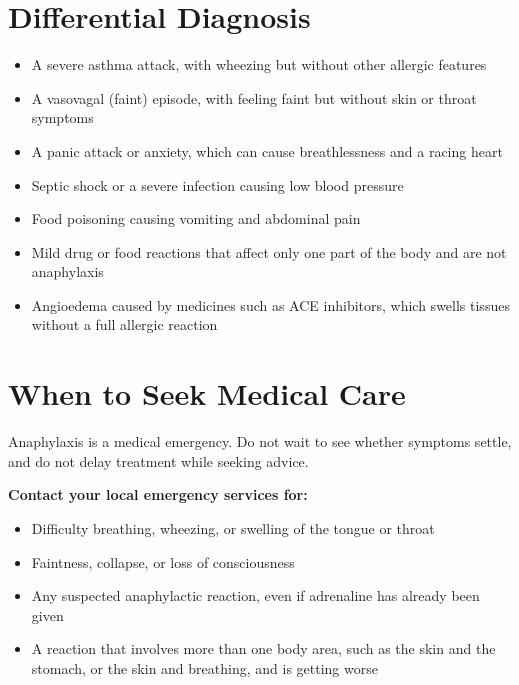 \section*{Differential Diagnosis}
\begin{itemize}
    \item A severe asthma attack, with wheezing but without other allergic features
    \item A vasovagal (faint) episode, with feeling faint but without skin or throat symptoms
    \item A panic attack or anxiety, which can cause breathlessness and a racing heart
    \item Septic shock or a severe infection causing low blood pressure
    \item Food poisoning causing vomiting and abdominal pain
    \item Mild drug or food reactions that affect only one part of the body and are not anaphylaxis
    \item Angioedema caused by medicines such as ACE inhibitors, which swells tissues without a full allergic reaction
\end{itemize}

\section*{When to Seek Medical Care}
Anaphylaxis is a medical emergency. Do not wait to see whether symptoms settle, and do not delay treatment while seeking advice.

\textbf{Contact your local emergency services for:}
\begin{itemize}
    \item Difficulty breathing, wheezing, or swelling of the tongue or throat
    \item Faintness, collapse, or loss of consciousness
    \item Any suspected anaphylactic reaction, even if adrenaline has already been given
    \item A reaction that involves more than one body area, such as the skin and the stomach, or the skin and breathing, and is getting worse
\end{itemize}

